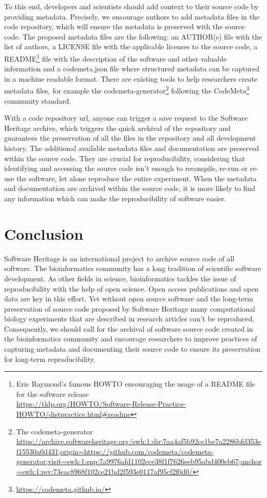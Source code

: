 \documentclass[long, final]{jobim}
\begin{document}
To this end, developers and scientists should add context to their source code by providing metadata. Precisely, we encourage authors to add metadata files in the code repository, which will ensure the metadata is preserved with the source code. The proposed metadata files are the following: an AUTHOR(s) file with the list of authors, a LICENSE file with the applicable licenses to the source code, a README\footnote{Eric Raymond's famous HOWTO encouraging the usage of a README file for the software release\\ 
\url{ https://tldp.org/HOWTO/Software-Release-Practice-HOWTO/distpractice.html\#readme}} file with the description of the software and other valuable information and a codemeta.json file where structured metadata can be captured in a machine readable format. There are existing tools to help researchers create metadata files, for example the codemeta-generator\footnote{The codemeta-generator \url{ https://archive.softwareheritage.org/swh:1:dir:7aa4af5b92ce1be7a2286bfd353ef15530a0d431;origin=https://github.com/codemeta/codemeta-generator;visit=swh:1:snp:7a9976afd1102ece38f1f7626eeb95abd400eb67;anchor=swh:1:rev:73eac8968f102ce21bd2f593e0117af95cf2f0d0/}} following the CodeMeta\footnote{\url{https://codemeta.github.io/}} community standard. 

With a code repository url, anyone can trigger a save request to the Software Heritage archive, which triggers the quick archival of the repository and guarantees the preservation of all the files in the repository and all development history. The additional available metadata files and documentation are preserved within the source code. They are crucial for reproducibility, considering that identifying and accessing the source code isn’t enough to recompile, re-run or re-use the software, let alone reproduce the entire experiment. When the metadata and documentation are archived within the source code, it is more likely to find any information which can make the reproducibility of software easier.


\section{Conclusion}

Software Heritage is an international project to archive source code of all software. The bioinformatics community has a long tradition of scientific software development. As other fields in science, bioinformatics tackles the issue of reproducibility with the help of open science. Open access publications and open data are key in this effort. Yet without open source software and the long-term preservation of source code proposed by Software Heritage many computational biology experiments that are described in research articles can’t be reproduced. Consequently, we should call for the archival of software source code created in the bioinformatics community and encourage researchers to improve practices of capturing metadata and documenting their source code to ensure its preservation for long-term reproducibility.
\end{document}
